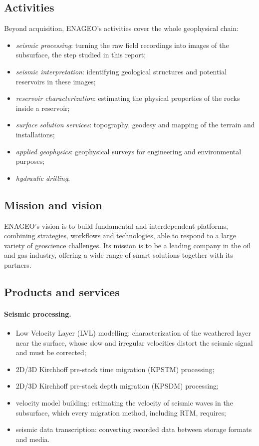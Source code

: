 \documentclass[letterpaper,11pt,leqno]{article}
\begin{document}
\subsection{Activities}
Beyond acquisition, ENAGEO's activities cover the whole geophysical chain:
\begin{itemize}
\item \emph{seismic processing}: turning the raw field recordings into images of
  the subsurface, the step studied in this report;
\item \emph{seismic interpretation}: identifying geological structures and
  potential reservoirs in these images;
\item \emph{reservoir characterization}: estimating the physical properties of the
  rocks inside a reservoir;
\item \emph{surface solution services}: topography, geodesy and mapping of the
  terrain and installations;
\item \emph{applied geophysics}: geophysical surveys for engineering and
  environmental purposes;
\item \emph{hydraulic drilling}.
\end{itemize}

\subsection{Mission and vision}
ENAGEO's vision is to build fundamental and interdependent platforms, combining
strategies, workflows and technologies, able to respond to a large variety of
geoscience challenges. Its mission is to be a leading company in the oil and gas
industry, offering a wide range of smart solutions together with its partners.

\subsection{Products and services}

\paragraph{Seismic processing.}
\begin{itemize}
\item Low Velocity Layer (LVL) modelling: characterization of the weathered layer
  near the surface, whose slow and irregular velocities distort the seismic
  signal and must be corrected;
\item 2D/3D Kirchhoff pre-stack time migration (KPSTM) processing;
\item 2D/3D Kirchhoff pre-stack depth migration (KPSDM) processing;
\item velocity model building: estimating the velocity of seismic waves in the
  subsurface, which every migration method, including RTM, requires;
\item seismic data transcription: converting recorded data between storage
  formats and media.
\end{itemize}
\end{document}
